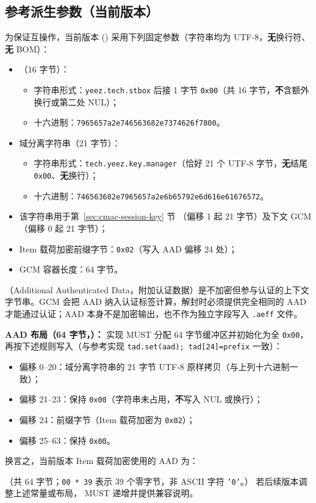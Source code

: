 \subsection{参考派生参数（当前版本）}\label{sec:ref-derive-params}
为保证互操作，当前版本 () 采用下列固定参数（字符串均为 UTF-8，\textbf{无}换行符、\textbf{无} BOM）：
\begin{itemize}
  \item {}（16 字节）：
        \begin{itemize}
          \item 字符串形式：\texttt{yeez.tech.stbox} 后接 1 字节 \texttt{0x00}（共 16 字节，\textbf{不}含额外换行或第二处 NUL）；
          \item 十六进制：\texttt{7965657a2e746563682e7374626f7800}。
        \end{itemize}
  \item 域分离字符串（21 字节）：
        \begin{itemize}
          \item 字符串形式：\texttt{tech.yeez.key.manager}（恰好 21 个 UTF-8 字节，\textbf{无}结尾 \texttt{0x00}、\textbf{无}换行）；
          \item 十六进制：\texttt{746563682e7965657a2e6b65792e6d616e61676572}。
        \end{itemize}
  \item 该字符串用于第~\ref{sec:cmac-session-key} 节 （偏移 1 起 21 字节）及下文 GCM （偏移 0 起 21 字节）；
  \item Item 载荷加密前缀字节：\texttt{0x02}（写入 AAD 偏移 24 处）；
  \item GCM  容器长度：64 字节。
\end{itemize}

（Additional Authenticated Data，附加认证数据）是不加密但参与认证的上下文字节串。GCM 会把 AAD 纳入认证标签计算，解封时必须提供完全相同的 AAD 才能通过认证；AAD 本身不是加密输出，也不作为独立字段写入 \texttt{.aeff} 文件。

\textbf{AAD 布局（64 字节，）：}
实现 MUST 分配 64 字节缓冲区并初始化为全 \texttt{0x00}，再按下述规则写入（与参考实现 \texttt{tad.set(aad); tad[24]=prefix} 一致）：
\begin{itemize}
  \item 偏移 0--20：域分离字符串的 21 字节 UTF-8 原样拷贝（与上列十六进制一致）；
  \item 偏移 21--23：保持 \texttt{0x00}（字符串未占用，\textbf{不}写入 NUL 或换行）；
  \item 偏移 24：前缀字节（Item 载荷加密为 \texttt{0x02}）；
  \item 偏移 25--63：保持 \texttt{0x00}。
\end{itemize}
换言之，当前版本 Item 载荷加密使用的 AAD 为：
\begin{center}
  \small
\end{center}
（共 64 字节；\texttt{00 * 39} 表示 39 个零字节，非 ASCII 字符 \texttt{'0'}。）
若后续版本调整上述常量或布局， MUST 递增并提供兼容说明。

